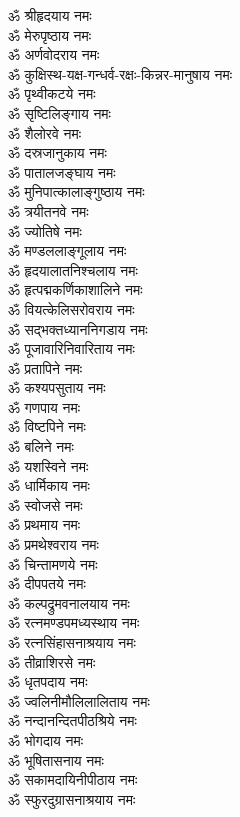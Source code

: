 \begin{multicols}{2}
\begin{flushleft}
ॐ श्रीहृदयाय नमः\\
ॐ मेरुपृष्ठाय नमः\\
ॐ अर्णवोदराय नमः\hfill{}\\
ॐ कुक्षिस्थ-यक्ष-गन्धर्व-रक्षः-किन्नर-मानुषाय नमः\\
ॐ पृथ्वीकटये नमः\\
ॐ सृष्टिलिङ्गाय नमः\\
ॐ शैलोरवे नमः\\
ॐ दस्रजानुकाय नमः\\
ॐ पातालजङ्घाय नमः\\
ॐ मुनिपात्कालाङ्गुष्ठाय नमः\\
ॐ त्रयीतनवे नमः\\
ॐ ज्योतिषे नमः\\
ॐ मण्डललाङ्गूलाय नमः\hfill{}\\
ॐ हृदयालातनिश्चलाय नमः\\
ॐ हृत्पद्मकर्णिकाशालिने नमः\\
ॐ वियत्केलिसरोवराय नमः\\
ॐ सद्भक्तध्याननिगडाय नमः\\
ॐ पूजावारिनिवारिताय नमः\\
ॐ प्रतापिने नमः\\
ॐ कश्यपसुताय नमः\\
ॐ गणपाय नमः\\
ॐ विष्टपिने नमः\\
ॐ बलिने नमः\hfill{}\\
ॐ यशस्विने नमः\\
ॐ धार्मिकाय नमः\\
ॐ स्वोजसे नमः\\
ॐ प्रथमाय नमः\\
ॐ प्रमथेश्वराय नमः\\
ॐ चिन्तामणये नमः\\
ॐ दीपपतये नमः\\
ॐ कल्पद्रुमवनालयाय नमः\\
ॐ रत्नमण्डपमध्यस्थाय नमः\\
ॐ रत्नसिंहासनाश्रयाय नमः\hfill{}\\
ॐ तीव्राशिरसे नमः\\
ॐ धृतपदाय नमः\\
ॐ ज्वलिनीमौलिलालिताय नमः\\
ॐ नन्दानन्दितपीठश्रिये नमः\\
ॐ भोगदाय नमः\\
ॐ भूषितासनाय नमः\\
ॐ सकामदायिनीपीठाय नमः\\
ॐ स्फुरदुग्रासनाश्रयाय नमः\\

\end{flushleft}
\end{multicols}
